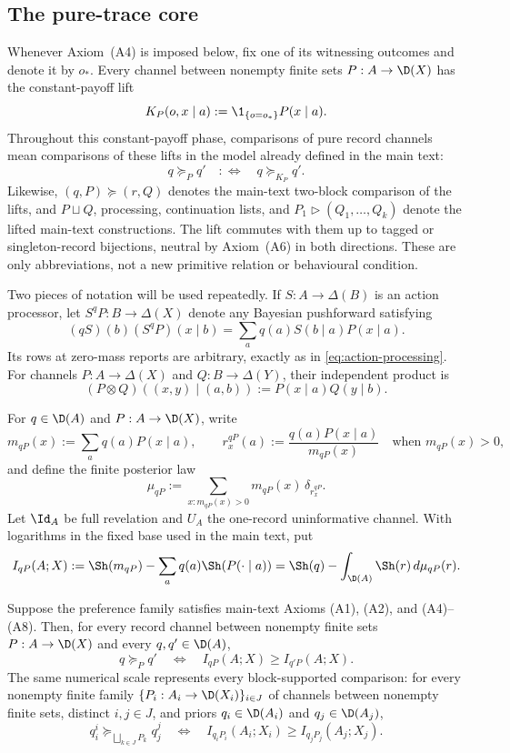 \subsection{The pure-trace core}
\label{pt:sec:environment}\label{lf:app:pure-trace}

Whenever Axiom~\textup{(A4)} is imposed below, fix one of its witnessing
outcomes and denote it by $o_\ast$.  Every channel between nonempty finite sets
$P:A\to\D(X)$ has the constant-payoff lift
\begin{equation}
K_P(o,x\mid a):=\1_{\{o=o_\ast\}}P(x\mid a).
\label{pt:eq:constant-payoff-lift}
\end{equation}
Throughout this constant-payoff phase, comparisons of pure record channels mean comparisons
of these lifts in the model already defined in the main text:
\[
q\succeq_Pq'\quad:\Longleftrightarrow\quad q\succeq_{K_P}q'.
\]
Likewise, $(q,P)\succeq(r,Q)$ denotes the main-text two-block comparison of
the lifts, and $P\sqcup Q$, processing, continuation lists, and
$P_1\triangleright(Q_1,\ldots,Q_k)$ denote the lifted main-text constructions.
The lift commutes with them up to tagged or singleton-record bijections,
neutral by Axiom~\textup{(A6)} in both directions.  These are only
abbreviations, not a new primitive relation or behavioural condition.

Two pieces of notation will be used repeatedly.  If
$S:A\to\Delta(B)$ is an action processor, let $S^qP:B\to\Delta(X)$ denote any
Bayesian pushforward satisfying
\[
 (qS)(b)(S^qP)(x\mid b)
 =\sum_a q(a)S(b\mid a)P(x\mid a).
\]
Its rows at zero-mass reports are arbitrary, exactly as in
\eqref{eq:action-processing}.  For channels $P:A\to\Delta(X)$ and
$Q:B\to\Delta(Y)$, their independent product is
\[
 (P\otimes Q)((x,y)\mid(a,b)):=P(x\mid a)Q(y\mid b).
\]

For $q\in\D(A)$ and $P:A\to\D(X)$, write
\[
m_{qP}(x):=\sum_a q(a)P(x\mid a),
\qquad
r_x^{qP}(a):=\frac{q(a)P(x\mid a)}{m_{qP}(x)}
\quad\text{when }m_{qP}(x)>0,
\]
and define the finite posterior law
\[
\mu_{qP}:=
\sum_{x:m_{qP}(x)>0}m_{qP}(x)\,\delta_{r_x^{qP}}.
\]
Let $\Id_A$ be full revelation and $U_A$ the one-record uninformative
channel.  With logarithms in the fixed base used in the main text, put
\[
I_{qP}(A;X)
:=\Sh(m_{qP})-\sum_a q(a)\Sh(P(\cdot\mid a))
=\Sh(q)-\int_{\D(A)}\Sh(r)\,d\mu_{qP}(r).
\]

\begin{proposition}\label{pt:prop:main}
Suppose the preference family satisfies main-text Axioms
\textup{(A1)}, \textup{(A2)}, and \textup{(A4)--(A8)}.  Then, for every record channel between
nonempty finite sets
$P:A\to\D(X)$ and every $q,q'\in\D(A)$,
\[
q\succeq_Pq'
\quad\Longleftrightarrow\quad
I_{qP}(A;X)\ge I_{q'P}(A;X).
\]
The same numerical scale represents every block-supported comparison: for
every nonempty finite family $\{P_i:A_i\to\D(X_i)\}_{i\in J}$ of channels
between nonempty finite sets, distinct $i,j\in J$,
and priors $q_i\in\D(A_i)$ and $q_j\in\D(A_j)$,
\[
q_i^i\succeq_{\bigsqcup_{k\in J}P_k}q_j^j
\quad\Longleftrightarrow\quad
I_{q_iP_i}(A_i;X_i)\ge I_{q_jP_j}(A_j;X_j).
\]
\end{proposition}

